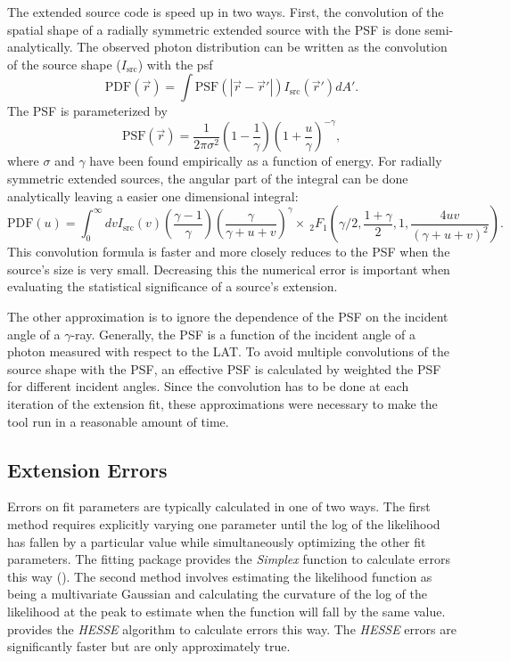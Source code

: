 \documentclass[12pt,preprint]{aastex}
\newcommand{\minuit}{\text{\em Minuit}\xspace}
\begin{document}
The extended source code is speed up in two ways. First, the convolution
of the spatial shape of a radially symmetric extended source with the PSF is
done semi-analytically. The observed photon
distribution can be written as the convolution of the source shape ($I_\text{src}$)
with the psf
\begin{equation}
  \text{PDF}(\vec r) = \int  \text{PSF}(|\vec r - \vec r'|)I_\text{src}(\vec r') d A'.
\end{equation}
The PSF is parameterized by
\begin{equation}
  \text{PSF}(\vec r) = 
  \frac{1}{2\pi\sigma^2}
  \left(1-\frac{1}{\gamma}\right)
  \left(1+\frac{u}{\gamma}\right)^{-\gamma},
\end{equation}
where $\sigma$ and $\gamma$ have been found empirically as a function
of energy.  For radially symmetric
extended sources, the angular part of the integral can be done analytically
leaving a easier one dimensional integral:
\begin{equation}
  \text{PDF}(u)= \int_0^\infty dv
  I_\text{src}(v) 
  \left(\frac{\gamma-1}{\gamma}\right)
  \left( \frac{\gamma}{\gamma + u + v}\right)^\gamma 
  \times ~_2F_1 \left(\gamma/2,\frac{1+\gamma}{2},1,\frac{4uv}{(\gamma+u+v)^2}\right).
\end{equation}
This convolution formula is faster and more closely reduces to the PSF
when the source's size is very small. Decreasing this the numerical
error is important when evaluating the statistical significance of a
source's extension.

The other approximation is to ignore the dependence of the PSF on the
incident angle of a $\gamma$-ray.  Generally, the PSF is a function
of the incident angle of a photon measured with respect to the LAT.
To avoid multiple convolutions of the source shape with the PSF, an
effective PSF is calculated by weighted the PSF for different incident
angles.  Since the convolution has to be done at each iteration of the
extension fit, these approximations were necessary to make the tool run
in a reasonable amount of time.



\subsection{Extension Errors}
\label{extension_error}

Errors on fit parameters are typically calculated in one of two
ways. The first method requires explicitly varying one parameter until
the log of the likelihood has fallen by a particular value while 
simultaneously
optimizing the other fit parameters. The
\minuit fitting package provides the {\em Simplex}
function to calculate errors this way (\cite{minuit_documentation}).
The second method involves estimating the likelihood function as being
a multivariate Gaussian and calculating the curvature of the log of
the likelihood at the peak to estimate when the function will fall 
by the same value. \minuit provides the {\em HESSE} algorithm to calculate
errors this way.  The {\em HESSE} errors are significantly faster but 
are only approximately true.
\end{document}
